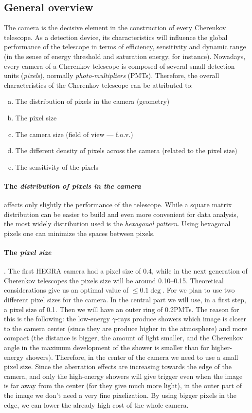 \subsection{General overview}
%
The camera is the decisive element in the construction of every
Cherenkov telescope. As a detection device, its characteristics will
influence the global performance of the telescope in terms of
efficiency, sensitivity and dynamic range (in the sense of energy
threshold and saturation energy, for instance). Nowadays, every camera
of a Cherenkov telescope is composed of several small detection units
(\emph{pixels}), normally \emph{photo-multipliers} (PMTs). Therefore,
the overall characteristics of the Cherenkov telescope can be
attributed to:
%
\begin{enumerate}[a.]
\item The distribution of pixels in the camera (geometry)
\item The pixel size
\item The camera size (field of view --- f.o.v.)
\item The different density of pixels across the camera (related to
the pixel size)
\item The sensitivity of the pixels
\end{enumerate}

\paragraph{The \emph{distribution of pixels in the camera}} affects only
slightly the performance of the telescope. While a square matrix
distribution can be easier to build and even more convenient for data
analysis, the most widely distribution used is the \emph{hexagonal
pattern}. Using hexagonal pixels one can minimize the spaces between
pixels.

\paragraph{The \emph{pixel size}}. The first HEGRA camera had a pixel 
size of 0.4\deg, while in the next generation of Cherenkov telescopes
the pixels size will be around 0.10\deg--0.15\deg. Theoretical
considerations give us an optimal value of $\leq 0.1\deg$. For \MAGIC
we plan to use two different pixel sizes for the camera. In the
central part we will use, in a first step, a pixel size of 0.1\deg.
Then we will have an outer ring of 0.2\deg PMTs. The reason for this
is the following: the low-energy $\gamma$-rays produce showers which
image is closer to the camera center (since they are produce higher in
the atmosphere) and more compact (the distance is bigger, the amount
of light smaller, and the Cherenkov angle in the maximum development
of the shower is smaller than for higher-energy showers). Therefore,
in the center of the camera we need to use a small pixel size. Since
the aberration effects are increasing towards the edge of the camera,
and only the high-energy showers will give trigger even when the image
is far away from the center (for they give much more light), in the
outer part of the image we don't need a very fine pixelization. By
using bigger pixels in the edge, we can lower the already high cost of
the whole camera.

